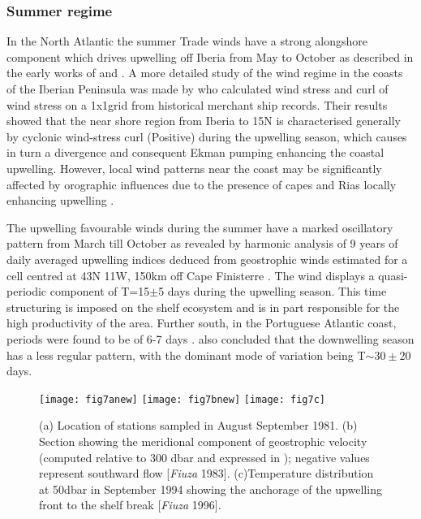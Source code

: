 \subsubsection{Summer regime} In the North Atlantic the summer
Trade winds have a strong alongshore component which drives
upwelling off Iberia from May to October as described in the early
works of \citet{Wooster76} and \citet{Fiuza82b}. A more detailed
study of the wind regime in the coasts of the Iberian Peninsula
was made by \citet{Bakun91} who calculated wind stress and curl of
wind stress on a 1x1\deg  grid from historical merchant ship
records. Their results showed that the near shore region from
Iberia to 15\deg N is characterised generally by cyclonic
wind-stress curl (Positive) during the upwelling season, which
causes in turn a divergence and consequent Ekman pumping enhancing
the coastal upwelling. However, local wind patterns near the coast
may be significantly affected by orographic influences due to the
presence of capes and Rias locally enhancing upwelling
\citep{Mcclain86}.

The upwelling favourable winds during the summer have a marked
oscillatory pattern from March till October as revealed by
harmonic analysis of 9 years of daily averaged upwelling indices
deduced from geostrophic winds estimated for a cell centred at
43\deg N 11\deg W, 150km off Cape Finisterre \citep{Nogueira97}.
The wind displays a quasi-periodic component of T=15$\pm$5 days
during the upwelling season. This time structuring is imposed on
the shelf ecosystem and is in part responsible for the high
productivity of the area. Further south, in the Portuguese
Atlantic coast, periods were found to be of 6-7 days
\citep{Sousa86}. \citet{Nogueira97} also concluded that the
downwelling season has a less regular pattern, with the dominant
mode of variation being T$\sim 30\pm$20 days.
\begin{figure}
  \centering
  \texttt{[image: fig7anew]}
  \texttt{[image: fig7bnew]}
  \texttt{[image: fig7c]}
    \caption{(a) Location of stations sampled in August September
  1981. (b) Section showing the meridional component of
  geostrophic velocity (computed relative to 300 dbar and
  expressed in \velc ); negative values represent southward flow
  [{\it Fiuza }1983]. (c)Temperature distribution at 50dbar in September
  1994 showing the anchorage of the upwelling front to the shelf
  break [{\it Fiuza }1996].}
  \label{fig:summerupw}
\end{figure}

